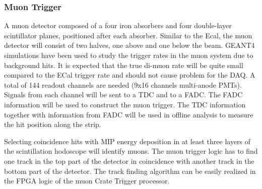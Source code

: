 
\subsubsection{Muon Trigger}

A muon detector composed of a four iron absorbers  and four double-layer scintillator planes, positioned after each absorber. Similar to the Ecal, the muon detector will consist of two halves, one above and one below the beam.
GEANT4 simulations have been used to study the trigger rates in the muon system due to background hits. It is expected that the true di-muon rate will be quite small compared to the ECal trigger rate and should not cause problem for the DAQ. 
A total of 144 readout channels are needed (9x16 channels multi-anode PMTs). Signals from each channel will be sent to a TDC and to a FADC. The FADC information will be used to construct the muon trigger. The TDC information together with information from FADC will be used in offline analysis to measure the hit position along the strip.

Selecting coincidence hits with MIP energy deposition in at least three layers of the scintillation hodoscope will identify muons. 
The muon trigger logic has to find one track in the top part of the detector in coincidence with another track in the bottom part of the detector. The track finding algorithm can be easily realized in the FPGA logic of the muon Crate Trigger processor.

